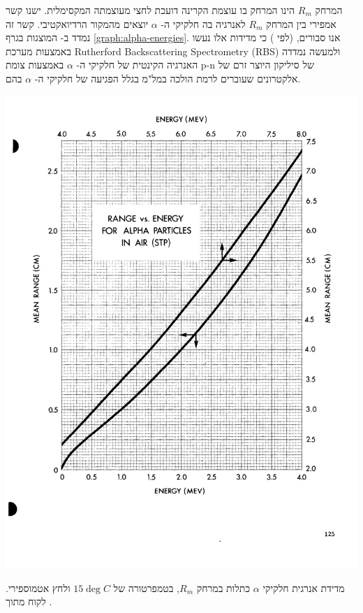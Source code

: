 \documentclass{article}
\begin{document}
המרחק
$R_m$
הינו המרחק בו עוצמת הקרינה דועכת לחצי מעוצמתה המקסימלית. ישנו קשר אמפירי בין המרחק
$R_m$
לאנרגיה בה חלקיקי ה-
$\alpha$
יוצאים מהמקור הרדיואקטיבי. קשר זה נמדד ב-
\cite{RadiologicalHandbook}
המוצגות בגרף
\ref{graph:alpha-energies}.
אנו סבורים,
(לפי
\cite{SE_alpha_energy})
כי מדידות אלו נעשו באמצעות מערכת 
\textenglish{Rutherford Backscattering Spectrometry (RBS)}
ולמעשה נמדדה האנרגיה הקינטית של חלקיקי ה-
$\alpha$
באמצעות צומת
\textenglish{p-n}
של סיליקון היוצר זרם של אלקטרונים שעוברים לרמת הולכה במל"מ בגלל הפגיעה של חלקיקי ה-
$\alpha$
בהם.

\begin{graph}
    \centering
    \includegraphics[width=\textwidth]{./ISL/radiological-alpha-energies.png}
    \caption{
    מדידת אנרגית חלקיקי
    $\alpha$
    כתלות במרחק
    $R_m$,
    בטמפרטורה של
    $15 \deg C$
    ולחץ אטמוספירי.
    לקוח מתוך
    \cite{RadiologicalHandbook}.
    }
    \label{graph:alpha-energies}
\end{graph}
\end{document}
